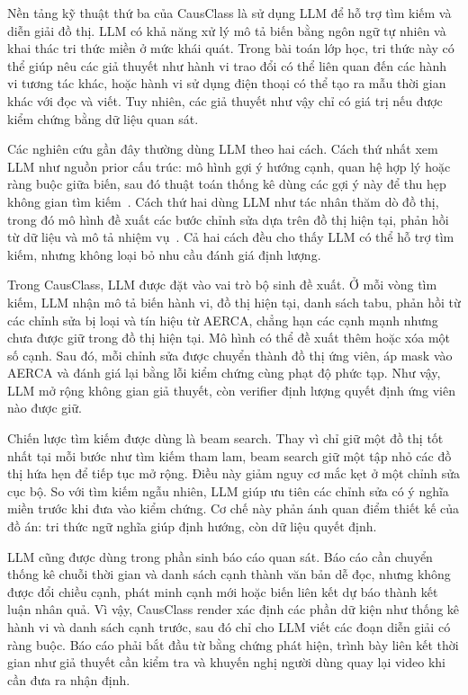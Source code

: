 Nền tảng kỹ thuật thứ ba của CausClass là sử dụng LLM để hỗ trợ tìm kiếm và diễn giải đồ thị. LLM có khả năng xử lý mô tả biến bằng ngôn ngữ tự nhiên và khai thác tri thức miền ở mức khái quát. Trong bài toán lớp học, tri thức này có thể giúp nêu các giả thuyết như hành vi trao đổi có thể liên quan đến các hành vi tương tác khác, hoặc hành vi sử dụng điện thoại có thể tạo ra mẫu thời gian khác với đọc và viết. Tuy nhiên, các giả thuyết như vậy chỉ có giá trị nếu được kiểm chứng bằng dữ liệu quan sát.

Các nghiên cứu gần đây thường dùng LLM theo hai cách. Cách thứ nhất xem LLM như nguồn prior cấu trúc: mô hình gợi ý hướng cạnh, quan hệ hợp lý hoặc ràng buộc giữa biến, sau đó thuật toán thống kê dùng các gợi ý này để thu hẹp không gian tìm kiếm \,\cite{darvariu2024llmpriors,barakati2025llmassisted}. Cách thứ hai dùng LLM như tác nhân thăm dò đồ thị, trong đó mô hình đề xuất các bước chỉnh sửa dựa trên đồ thị hiện tại, phản hồi từ dữ liệu và mô tả nhiệm vụ \,\cite{jiralerspong2024efficient,roy2025causalllm,peng2026causcientist}. Cả hai cách đều cho thấy LLM có thể hỗ trợ tìm kiếm, nhưng không loại bỏ nhu cầu đánh giá định lượng.

Trong CausClass, LLM được đặt vào vai trò bộ sinh đề xuất. Ở mỗi vòng tìm kiếm, LLM nhận mô tả biến hành vi, đồ thị hiện tại, danh sách tabu, phản hồi từ các chỉnh sửa bị loại và tín hiệu từ AERCA, chẳng hạn các cạnh mạnh nhưng chưa được giữ trong đồ thị hiện tại. Mô hình có thể đề xuất thêm hoặc xóa một số cạnh. Sau đó, mỗi chỉnh sửa được chuyển thành đồ thị ứng viên, áp mask vào AERCA và đánh giá lại bằng lỗi kiểm chứng cùng phạt độ phức tạp. Như vậy, LLM mở rộng không gian giả thuyết, còn verifier định lượng quyết định ứng viên nào được giữ.

Chiến lược tìm kiếm được dùng là beam search. Thay vì chỉ giữ một đồ thị tốt nhất tại mỗi bước như tìm kiếm tham lam, beam search giữ một tập nhỏ các đồ thị hứa hẹn để tiếp tục mở rộng. Điều này giảm nguy cơ mắc kẹt ở một chỉnh sửa cục bộ. So với tìm kiếm ngẫu nhiên, LLM giúp ưu tiên các chỉnh sửa có ý nghĩa miền trước khi đưa vào kiểm chứng. Cơ chế này phản ánh quan điểm thiết kế của đồ án: tri thức ngữ nghĩa giúp định hướng, còn dữ liệu quyết định.

LLM cũng được dùng trong phần sinh báo cáo quan sát. Báo cáo cần chuyển thống kê chuỗi thời gian và danh sách cạnh thành văn bản dễ đọc, nhưng không được đổi chiều cạnh, phát minh cạnh mới hoặc biến liên kết dự báo thành kết luận nhân quả. Vì vậy, CausClass render xác định các phần dữ kiện như thống kê hành vi và danh sách cạnh trước, sau đó chỉ cho LLM viết các đoạn diễn giải có ràng buộc. Báo cáo phải bắt đầu từ bằng chứng phát hiện, trình bày liên kết thời gian như giả thuyết cần kiểm tra và khuyến nghị người dùng quay lại video khi cần đưa ra nhận định.

